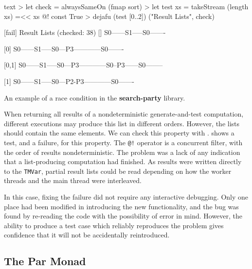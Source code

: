 \begin{listing}
\centering
\begin{cminted}{text}
> let check = alwaysSameOn (fmap sort)
> let test xs = takeStream (length xs) =<< xs @! const True
> dejafu (test [0..2]) ("Result Lists", check)

[fail] Result Lists (checked: 38)
        [] S0------S1-----S0-------

        [0] S0------S1-----S0---P3------------S0-------

        [0,1] S0------S1-----S0---P3------------S0--P3------S0--------

        [1] S0------S1-----S0---P2-P3------------S0-------
\end{cminted}
\caption{An example of a race condition in the \textbf{search-party} library.}\label{lst:example-searchparty2}
\end{listing}

When returning all results of a nondeterministic generate-and-test
computation, different executions may produce this list in different
orders.  However, the lists should contain the same elements.  We can
check this property with \dejafu{}.  
shows a test, and a failure, for this property.  The \verb|@!|
operator is a concurrent filter, with the order of results
nondeterministic.  The problem was a lack of any indication that a
list-producing computation had finished.  As results were written
directly to the \verb|TMVar|, partial result lists could be read
depending on how the worker threads and the main thread were
interleaved.

In this case, fixing the failure did not require any interactive
debugging.  Only one place had been modified in introducing the new
functionality, and the bug was found by re-reading the code with the
possibility of error in mind.  However, the ability to produce a test
case which reliably reproduces the problem gives confidence that it
will not be accidentally reintroduced.

\FloatBarrier
\subsection{The Par Monad}

